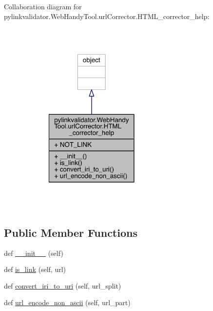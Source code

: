 Collaboration diagram for pylinkvalidator.\+Web\+Handy\+Tool.\+url\+Corrector.\+H\+T\+M\+L\+\_\+corrector\+\_\+help\+:
\nopagebreak
\begin{figure}[H]
\begin{center}
\leavevmode
\includegraphics[width=210pt]{classpylinkvalidator_1_1_web_handy_tool_1_1url_corrector_1_1_h_t_m_l__corrector__help__coll__graph}
\end{center}
\end{figure}
\subsection*{Public Member Functions}
\begin{DoxyCompactItemize}
\item 
def \hyperlink{classpylinkvalidator_1_1_web_handy_tool_1_1url_corrector_1_1_h_t_m_l__corrector__help_ab6ebabc9defb9cba0d6dedb9254149b8}{\+\_\+\+\_\+init\+\_\+\+\_\+} (self)
\item 
def \hyperlink{classpylinkvalidator_1_1_web_handy_tool_1_1url_corrector_1_1_h_t_m_l__corrector__help_ae1494f4d37f13c5a1bc9a46e00b48bc5}{is\+\_\+link} (self, url)
\item 
def \hyperlink{classpylinkvalidator_1_1_web_handy_tool_1_1url_corrector_1_1_h_t_m_l__corrector__help_abc2880e66a8f0145fef8e1629f465d17}{convert\+\_\+iri\+\_\+to\+\_\+uri} (self, url\+\_\+split)
\item 
def \hyperlink{classpylinkvalidator_1_1_web_handy_tool_1_1url_corrector_1_1_h_t_m_l__corrector__help_a894ef6c5bc2150372a36b8c0abbca8d2}{url\+\_\+encode\+\_\+non\+\_\+ascii} (self, url\+\_\+part)
\end{DoxyCompactItemize}
